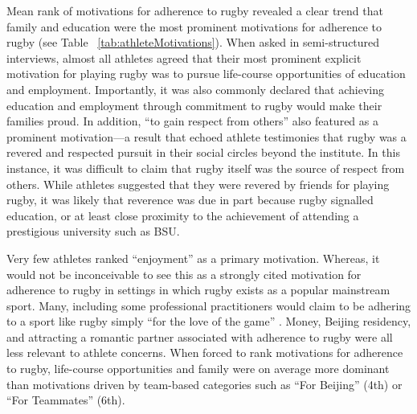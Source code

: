 \begin{CJK}{UTF8}{gbsn}
Mean rank of motivations for adherence to rugby revealed a clear trend that family and education were the most prominent motivations for adherence to rugby (see Table ~\ref{tab:athleteMotivations}).  When asked in semi-structured interviews, almost all athletes agreed that their most prominent explicit motivation for playing rugby was to pursue life-course opportunities of education and employment.  Importantly, it was also commonly declared that achieving education and employment through commitment to rugby would make their families proud.  In addition, ``to gain respect from others'' also featured as a prominent motivation—a result that echoed athlete testimonies that rugby was a revered and respected pursuit in their social circles beyond the institute.  In this instance, it was difficult to claim that rugby itself was the source of respect from others. While athletes suggested that they were revered by friends for playing rugby, it was likely that reverence was due in part because rugby signalled education, or at least close proximity to the achievement of attending a prestigious university such as BSU.

Very few athletes ranked ``enjoyment'' as a primary motivation.  Whereas, it would not be inconceivable to see this as a strongly cited motivation for adherence to rugby in settings in which rugby exists as a popular mainstream sport.  Many, including some professional practitioners would claim to be adhering to a sport like rugby simply ``for the love of the game'' \citep{Jackson1998}.  Money, Beijing residency, and attracting a romantic partner associated with adherence to rugby were all less relevant to athlete concerns.  When forced to rank motivations for adherence to rugby, life-course opportunities and family were on average more dominant than motivations driven by team-based categories such as ``For Beijing'' (4th) or ``For Teammates'' (6th).
                     


\end{CJK}
